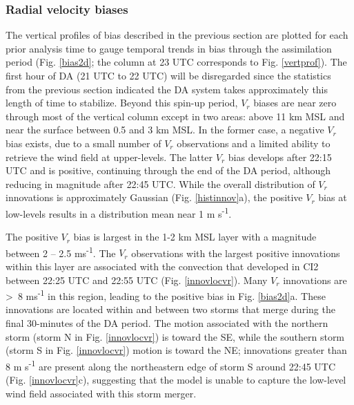 \subsubsection{Radial velocity biases}
The vertical profiles of bias described in the previous section are plotted for each prior analysis time to gauge temporal trends in bias through the assimilation period (Fig. \ref{bias2d}; the column at 23 UTC corresponds to Fig. \ref{vertprof}). The first hour of DA (21 UTC to 22 UTC) will be disregarded since the statistics from the previous section indicated the DA system takes approximately this length of time to stabilize. Beyond this spin-up period, \(V_r\) biases are near zero through most of the vertical column except in two areas: above 11 km MSL and near the surface between 0.5 and 3 km MSL. In the former case, a negative \(V_r\) bias exists, due to a small number of \(V_r\) observations and a limited ability to retrieve the wind field at upper-levels. The latter \(V_r\) bias develops after 22:15 UTC and is positive, continuing through the end of the DA period, although reducing in magnitude after 22:45 UTC. While the overall distribution of \(V_r\) innovations is approximately Gaussian (Fig. \ref{histinnov}a), the positive \(V_r\) bias at low-levels results in a distribution mean near 1 m s\textsuperscript{-1}. 

The positive \(V_r\) bias is largest in the 1-2 km MSL layer with a magnitude between 2 -- 2.5 ms\textsuperscript{-1}. The \(V_r\) observations with the largest positive innovations within this layer are associated with the convection that developed in CI2 between 22:25 UTC and 22:55 UTC (Fig. \ref{innovlocvr}). Many \(V_r\) innovations are \textgreater\, 8 ms\textsuperscript{-1} in this region, leading to the positive bias in Fig. \ref{bias2d}a. These innovations are located within and between two storms that merge during the final 30-minutes of the DA period. The motion associated with the northern storm (storm N in Fig. \ref{innovlocvr}) is toward the SE, while the southern storm (storm S in Fig. \ref{innovlocvr}) motion is toward the NE; innovations greater than 8 m s\textsuperscript{-1} are present along the northeastern edge of storm S around 22:45 UTC (Fig. \ref{innovlocvr}c), suggesting that the model is unable to capture the low-level wind field associated with this storm merger.

